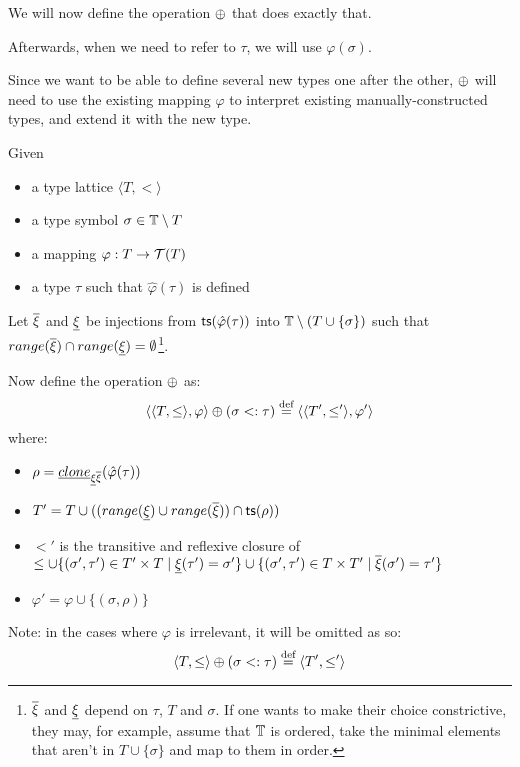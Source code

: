 \documentclass[main.tex]{subfiles}
\begin{document}
We will now define the operation $\oplus$ that does exactly that.

Afterwards, when we need to refer to $\tau$, we will use $\varphi(\sigma)$.

Since we want to be able to define several new types one after the other,
$\oplus$ will need to use the existing mapping $\varphi$ to interpret
existing manually-constructed types, and extend it with the new type.
\begin{defn}
    \label{def:subadd}
    Given
    \begin{itemize}
        \item a type lattice $\langle T, \less \rangle$
        \item a type symbol $\sigma \in \mathbb{T} \setminus T$
        \item a mapping $\varphi : T \rightarrow \mathcal{T}( T )$
        \item a type $\tau$ such that $\hat{\varphi}(\tau)$ is defined
    \end{itemize}
    Let $\overline{\xi}$ and $\underline{\xi}$ be injections from
    $\mathsf{ts}(\hat{\varphi}(\tau))$ into $\mathbb{T} \setminus (T \cup \{ \sigma \})$ such that
    $range(\overline{\xi}) \cap range(\underline{\xi}) = \emptyset$\footnote{
        $\overline{\xi}$ and $\underline{\xi}$ depend on $\tau$, $T$ and
        $\sigma$. If one wants to make their choice constrictive, they may,
        for example, assume that $\mathbb{T}$ is ordered, take the minimal
        elements that aren't in $T \cup \{ \sigma \}$ and map to them in
        order.
    }.

    Now define the operation $\oplus$ as:
        \[ \langle \langle T, \leq \rangle, \varphi \rangle
            \oplus (\sigma <: \tau)
            \overset{\text{\scriptsize def}}{=}
            \langle \langle T', \leq' \rangle, \varphi' \rangle
        \] where:
    \begin{itemize}
        \item $\rho = \underline{clone}_{\underline{\xi} \overline{\xi}}(\hat{\varphi}(\tau))$
        \item $T' = T \cup ((range(\underline{\xi}) \cup range(\overline{\xi})) \cap \mathsf{ts}(\rho))$
        \item $\less'$ is the transitive and reflexive closure of
            $\leq \cup \{ (\sigma', \tau') \in T' \times T \mid \underline{\xi}(\tau') = \sigma' \}
                   \cup \{ (\sigma', \tau') \in T \times T' \mid \overline{\xi}(\sigma') = \tau' \}$
        \item $\varphi' = \varphi \cup \{ (\sigma, \rho) \}$
    \end{itemize}

    Note: in the cases where $\varphi$ is irrelevant, it will be omitted as
    so:
    \[ \langle T, \leq \rangle
        \oplus (\sigma <: \tau)
        \overset{\text{\scriptsize def}}{=}
        \langle T', \leq' \rangle
    \]
\end{defn}
\end{document}

